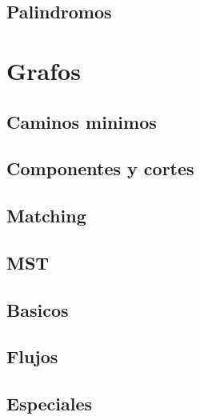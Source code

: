 \documentclass{article}
\begin{document}
	\subsection{Palindromos}
	

	\section{Grafos}
	\subsection{Caminos minimos}
	
	
	
	

	\subsection{Componentes y cortes}
	
	
	
	

	\subsection{Matching}
	
	

	\subsection{MST}
	
	

	\subsection{Basicos}
	
	
	

	\subsection{Flujos}
	
	
	

	\subsection{Especiales}
	
	
	
\end{document}
